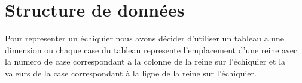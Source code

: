 \section{Structure de données}

Pour representer un échiquier nous avons décider d'utiliser un tableau a une dimension ou chaque case du tableau represente l'emplacement d'une reine avec la numero de case correspondant a la colonne de la reine sur l'échiquier et la valeurs de la case correspondant à la ligne de la reine sur l'échiquier.
